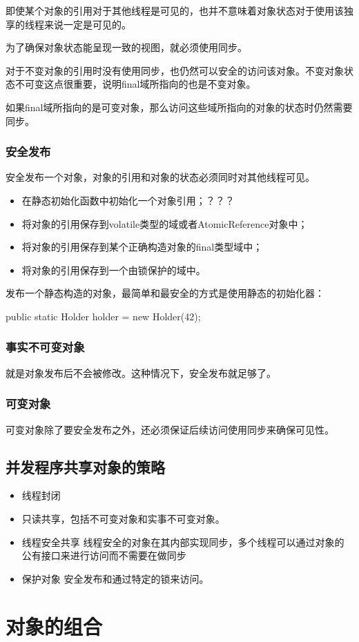 即使某个对象的引用对于其他线程是可见的，也并不意味着对象状态对于使用该独享的线程来说一定是可见的。

为了确保对象状态能呈现一致的视图，就必须使用同步。

对于不变对象的引用时没有使用同步，也仍然可以安全的访问该对象。不变对象状态不可变这点很重要，说明final域所指向的也是不变对象。

如果final域所指向的是可变对象，那么访问这些域所指向的对象的状态时仍然需要同步。

\subsubsection{安全发布}

安全发布一个对象，对象的引用和对象的状态必须同时对其他线程可见。
\begin{itemize}
\item 在静态初始化函数中初始化一个对象引用；？？？
\item 将对象的引用保存到volatile类型的域或者AtomicReference对象中；
\item 将对象的引用保存到某个正确构造对象的final类型域中；
\item 将对象的引用保存到一个由锁保护的域中。
\end{itemize}

发布一个静态构造的对象，最简单和最安全的方式是使用静态的初始化器：
\begin{Java}
public static Holder holder = new Holder(42);
\end{Java}

\subsubsection{事实不可变对象}
就是对象发布后不会被修改。这种情况下，安全发布就足够了。

\subsubsection{可变对象}

可变对象除了要安全发布之外，还必须保证后续访问使用同步来确保可见性。

\subsection{并发程序共享对象的策略}
\begin{itemize}
\item 线程封闭
\item 只读共享，包括不可变对象和实事不可变对象。
\item 线程安全共享 线程安全的对象在其内部实现同步，多个线程可以通过对象的公有接口来进行访问而不需要在做同步
\item 保护对象 安全发布和通过特定的锁来访问。
\end{itemize}


\section{对象的组合}


















